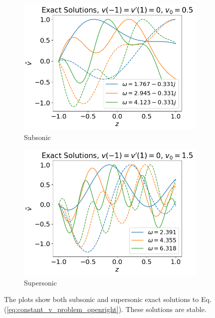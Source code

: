 \begin{figure}[H]
	\centering
	\begin{subfigure}{0.5\textwidth}
		\includegraphics[width=\linewidth]{img/theoretical_analysis/exact_openright_v0=0.5}
		\caption{Subsonic}
	\end{subfigure}%
	\begin{subfigure}{0.5\textwidth}
		\includegraphics[width=\linewidth]{img/theoretical_analysis/exact_openright_v0=1.5}
		\caption{Supersonic}
	\end{subfigure}
	\caption{The plots show both subsonic and supersonic exact solutions to Eq.(\ref{eq:constant_v_problem_openright}). These solutions are stable.}
	\label{fig:exact_v_openright}
\end{figure}


